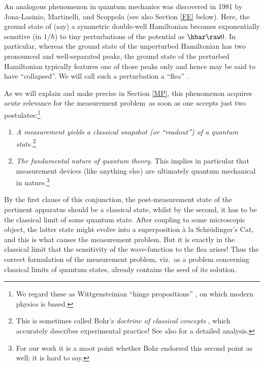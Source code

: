 \documentclass[12pt]{article}
\newcommand{\mmp}{measurement problem}
\begin{document}
An analogous phenomenon in quantum mechanics was  discovered in 1981 by Jona-Lasinio, Martinelli, and Scoppola 
\cite{JLMS1,JLMS2} (see also Section \ref{FE} below). Here,  the ground state of (say) a symmetric double-well  Hamiltonian becomes 
exponentially sensitive (in $1/\hbar$)  to tiny perturbations of the potential as $\hbar\raw 0$. 
In particular, whereas the ground state of the unperturbed Hamiltonian has two pronounced and well-separated peaks, the ground state of the perturbed Hamiltonian typically features one of those peaks only and hence may be said to have ``collapsed''. We will  call such a perturbation a ``flea'' \cite{Simon4}.

As we will explain and make precise in Section \ref{MP}, this  phenomenon acquires acute relevance for the \mmp\ as soon as 
one accepts just two postulates:\footnote{We regard these as Wittgensteinian ``hinge propositions'' \cite{OC}, on which modern physics is based.}
\begin{enumerate}
\item \emph{A measurement yields a classical snapshot (or ``readout'') of a quantum state.}\footnote{This is sometimes called Bohr's \emph{doctrine of classical concepts} \cite{Scheibe},
 which accurately describes experimental practice!
 See also \cite{handbook} for a detailed analysis. }
 \item \emph{The fundamental nature of quantum theory.} This implies in particular that measurement devices (like anything else) are ultimately quantum mechanical in nature.\footnote{For our work it is a moot point whether Bohr endorsed this second point as well; it is hard to say.}
\end{enumerate}
By the first clause of this conjunction, the post-measurement state of the pertinent apparatus should be a classical state, whilst by the second, it has to be  the classical limit of some quantum state.
 After coupling to some microscopic object, the latter state might evolve into a superposition \`{a} la Schr\"{o}dinger's Cat, and this is what causes the \mmp.  But it is exactly in the classical limit that the sensitivity of the wave-function to the flea arises! Thus the correct formulation of the \mmp, viz.\   as a problem concerning classical limits of quantum states, already contains the seed of its solution. 
 
\end{document}
